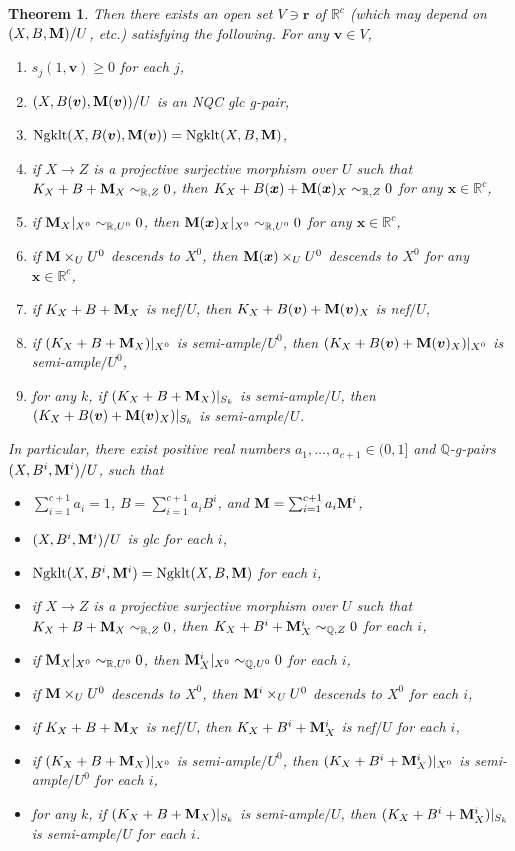 \documentclass[11pt]{amsart}
\numberwithin{equation}{section}
\newcommand{\Mm}{{\bf{M}}}
\newcommand{\Qq}{\mathbb{Q}}
\newcommand{\Rr}{\mathbb{R}}
\newcommand{\Ngklt}{\operatorname{Ngklt}}
\newtheorem{thm}{Theorem}[section]
\theoremstyle{definition}
\theoremstyle{definition}
\theoremstyle{definition}
\begin{document}
\begin{thm}
Then there exists an open set $V\ni\bm{r}$ of $\mathbb R^c$ (which may depend on $(X,B,\Mm)/U$, etc.) satisfying the following. For any $\bm{v}\in V$,
\begin{enumerate}
\item $s_j(1,\bm{v})\geq 0$ for each $j$,
\item $(X,B(\bm{v}),\Mm(\bm{v}))/U$ is an NQC glc g-pair,
\item $\Ngklt(X,B(\bm{v}),\Mm(\bm{v}))=\Ngklt(X,B,\Mm)$,
\item if $X\rightarrow Z$ is a projective surjective morphism over $U$ such that $K_X+B+\Mm_X\sim_{\Rr,Z}0$, then $K_X+B(\bm{x})+\Mm(\bm{x})_X\sim_{\Rr,Z}0$ for any $\bm{x}\in\mathbb R^c$,
\item if $\Mm_X|_{X^0}\sim_{\Rr,U^0}0$, then $\Mm(\bm{x})_X|_{X^0}\sim_{\Rr,U^0}0$ for any $\bm{x}\in\mathbb R^c$,
\item if $\Mm\times_UU^0$ descends to $X^0$, then $\Mm(\bm{x})\times_UU^0$ descends to $X^0$ for any $\bm{x}\in\mathbb R^c$, 
\item if $K_X+B+\Mm_X$ is nef$/U$, then $K_X+B(\bm{v})+\Mm(\bm{v})_X$ is nef$/U$,
\item if $(K_X+B+\Mm_X)|_{X^0}$ is semi-ample$/U^0$, then $(K_X+B(\bm{v})+\Mm(\bm{v})_X)|_{X^0}$ is semi-ample$/U^0$,
\item for any $k$, if $(K_X+B+\Mm_X)|_{S_k}$ is semi-ample$/U$, then $(K_X+B(\bm{v})+\Mm(\bm{v})_X)|_{S_k}$ is semi-ample$/U$.
\end{enumerate}
In particular, there exist positive real numbers $a_1,\dots,a_{c+1}\in (0,1]$ and $\Qq$-g-pairs $(X,B^i,\Mm^i)/U$, such that
\begin{itemize}
    \item $\sum_{i=1}^{c+1}a_i=1$, $B=\sum_{i=1}^{c+1}a_iB^i$, and $\Mm=\sum_{i=1}^{c+1}a_i\Mm^i$,
    \item $(X,B^i,\Mm^i)/U$ is glc for each $i$,
    \item $\Ngklt(X,B^i,\Mm^i)=\Ngklt(X,B,\Mm)$ for each $i$,
    \item if $X\rightarrow Z$ is a projective surjective morphism over $U$ such that $K_X+B+\Mm_X\sim_{\Rr,Z}0$, then $K_X+B^i+\Mm^i_X\sim_{\Qq,Z}0$ for each $i$,
    \item if $\Mm_X|_{X^0}\sim_{\Rr,U^0}0$, then $\Mm^i_X|_{X^0}\sim_{\Qq,U^0}0$ for each $i$,
\item if $\Mm\times_UU^0$ descends to $X^0$, then $\Mm^i\times_UU^0$ descends to $X^0$ for each $i$,
\item if $K_X+B+\Mm_X$ is nef$/U$, then $K_X+B^i+\Mm^i_X$ is nef$/U$ for each $i$,
\item if $(K_X+B+\Mm_X)|_{X^0}$ is semi-ample$/U^0$, then $(K_X+B^i+\Mm^i_X)|_{X^0}$ is semi-ample$/U^0$ for each $i$,
\item for any $k$, if $(K_X+B+\Mm_X)|_{S_k}$ is semi-ample$/U$, then $(K_X+B^i+\Mm^i_X)|_{S_k}$ is semi-ample$/U$ for each $i$.
\end{itemize}
\end{thm}
\end{document}
